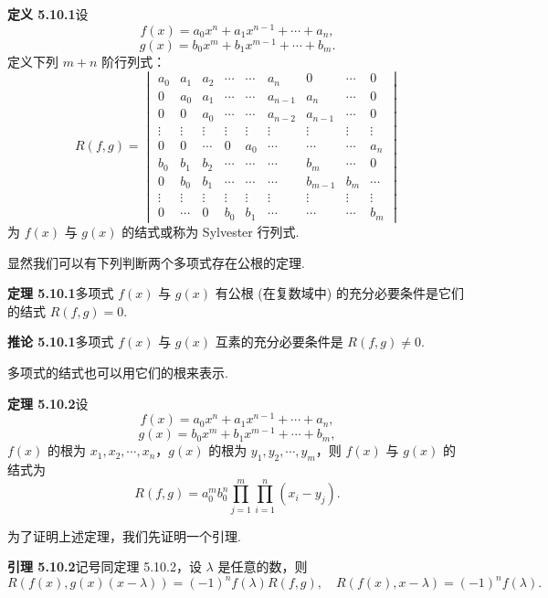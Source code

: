 \documentclass[UTF8,12pt,a4paper,fontset=fandol]{ctexart}
\begin{document}
\noindent\textbf{定义 5.10.1}\quad 设
\[
f(x)=a_0x^n+a_1x^{n-1}+\cdots+a_n,
\]
\[
g(x)=b_0x^m+b_1x^{m-1}+\cdots+b_m.
\]
定义下列 $m+n$ 阶行列式：
\[
R(f,g)=
\begin{vmatrix}
a_0&a_1&a_2&\cdots&\cdots&a_n&0&\cdots&0\\
0&a_0&a_1&\cdots&\cdots&a_{n-1}&a_n&\cdots&0\\
0&0&a_0&\cdots&\cdots&a_{n-2}&a_{n-1}&\cdots&0\\
\vdots&\vdots&\vdots&\vdots&\vdots&\vdots&\vdots&\vdots&\vdots\\
0&0&\cdots&0&a_0&\cdots&\cdots&\cdots&a_n\\
b_0&b_1&b_2&\cdots&\cdots&\cdots&b_m&\cdots&0\\
0&b_0&b_1&\cdots&\cdots&\cdots&b_{m-1}&b_m&\cdots\\
\vdots&\vdots&\vdots&\vdots&\vdots&\vdots&\vdots&\vdots&\vdots\\
0&\cdots&0&b_0&b_1&\cdots&\cdots&\cdots&b_m
\end{vmatrix}
\]
为 $f(x)$ 与 $g(x)$ 的结式或称为 Sylvester 行列式.

显然我们可以有下列判断两个多项式存在公根的定理.

\noindent\textbf{定理 5.10.1}\quad 多项式 $f(x)$ 与 $g(x)$ 有公根 (在复数域中) 的充分必要条件是它们的结式 $R(f,g)=0$.

\noindent\textbf{推论 5.10.1}\quad 多项式 $f(x)$ 与 $g(x)$ 互素的充分必要条件是 $R(f,g)\neq 0$.

多项式的结式也可以用它们的根来表示.

\noindent\textbf{定理 5.10.2}\quad 设
\[
f(x)=a_0x^n+a_1x^{n-1}+\cdots+a_n,
\]
\[
g(x)=b_0x^m+b_1x^{m-1}+\cdots+b_m,
\]
$f(x)$ 的根为 $x_1,x_2,\cdots,x_n$，$g(x)$ 的根为 $y_1,y_2,\cdots,y_m$，则 $f(x)$ 与 $g(x)$ 的结式为
\begin{equation}
R(f,g)=a_0^mb_0^n\prod_{j=1}^m\prod_{i=1}^n(x_i-y_j).
\tag{5.10.2}
\end{equation}

为了证明上述定理，我们先证明一个引理.

\noindent\textbf{引理 5.10.2}\quad 记号同定理 5.10.2，设 $\lambda$ 是任意的数，则
\[
R(f(x),g(x)(x-\lambda))=(-1)^nf(\lambda)R(f,g),\quad R(f(x),x-\lambda)=(-1)^nf(\lambda).
\]
\end{document}
